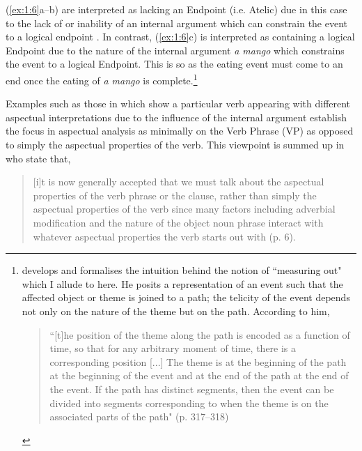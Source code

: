 (\ref{ex:1:6}a--b) are interpreted as lacking an Endpoint (i.e. Atelic) due in
this case to the lack of or inability of an internal argument which can
constrain the event to a logical endpoint \citep[cf.][]{Tenny1994}.  In
contrast, (\ref{ex:1:6}c) is interpreted as containing a logical Endpoint due to
the nature of the internal argument \textit{a mango} which constrains the event to a
logical Endpoint. This is so as the eating event must come to an end once the
eating of \textit{a mango} is complete.\footnote{\citet{Jackendoff1996} develops and
  formalises the intuition behind the notion of  ``measuring out"
  \citep{Tenny1994} which I allude to here. He posits a representation of an
  event such that the affected object or theme is joined to a path; the telicity
  of the event depends not only on the nature of the theme but on the path.
  According to him,
  
  \begin{quote} ``[t]he position of the theme along the path is encoded as a
  function of time, so that for any arbitrary moment of time, there is a
  corresponding position [...] The theme is at the beginning of the path at the
  beginning of the event and at the end of the path at the end of the event. If
  the path has distinct segments, then the event can be divided into segments
corresponding to when the theme is on the associated parts of the path" (p. 317--318)\end{quote}}

Examples such as those in  which show a particular verb
appearing with different aspectual interpretations due to the
influence of the internal argument establish the focus in aspectual
analysis as minimally on the Verb Phrase (VP) as opposed to simply the
aspectual properties of the verb. This viewpoint is summed up in 
\citet{TennyPustejovsky2000} who state that,

\begin{quote}
[i]t is now generally accepted that we must talk about the aspectual
properties of the verb phrase or the clause, rather than simply the
aspectual properties of the verb since many factors including
adverbial modification and the nature of the object noun phrase
interact with whatever aspectual properties the verb starts out
with (p. 6).
\end{quote}

